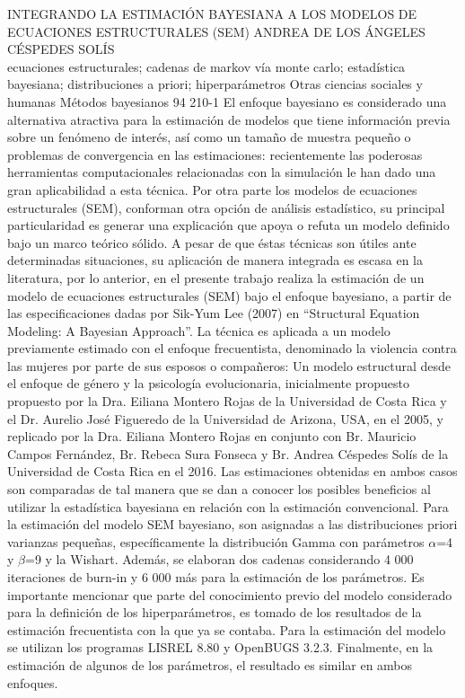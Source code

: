 \A
{INTEGRANDO LA ESTIMACIÓN BAYESIANA A LOS MODELOS DE ECUACIONES ESTRUCTURALES (SEM)}
{ANDREA DE LOS ÁNGELES CÉSPEDES SOLÍS}
{
\\
}
{ecuaciones estructurales; cadenas de markov vía monte carlo; estadística bayesiana; distribuciones a priori; hiperparámetros} 
 {Otras ciencias sociales y humanas} 
 {Métodos bayesianos} 
 {94} 
 {210-1}
{El enfoque bayesiano es considerado una alternativa atractiva para la estimación de modelos que tiene información previa sobre un fenómeno de interés, así como un tamaño de muestra pequeño o problemas de convergencia en las estimaciones: recientemente las poderosas herramientas computacionales relacionadas con la simulación le han dado una gran aplicabilidad a esta técnica. Por otra parte los modelos de ecuaciones estructurales (SEM), conforman otra opción de análisis estadístico, su principal particularidad es generar una explicación que apoya o refuta un modelo definido bajo un marco teórico sólido. A pesar de que éstas técnicas son útiles ante determinadas situaciones, su aplicación de manera integrada es escasa en la literatura, por lo anterior, en el presente trabajo realiza la estimación de un modelo de ecuaciones estructurales (SEM) bajo el enfoque bayesiano, a partir de las especificaciones dadas por Sik-Yum Lee (2007) en “Structural Equation Modeling: A Bayesian Approach”. La técnica es aplicada a un modelo previamente estimado con el enfoque frecuentista, denominado la violencia contra las mujeres por parte de sus esposos o compañeros: Un modelo estructural desde el enfoque de género y la psicología evolucionaria, inicialmente propuesto propuesto por la Dra. Eiliana Montero Rojas de la Universidad de Costa Rica y el Dr. Aurelio José Figueredo de la Universidad de Arizona, USA, en el 2005, y replicado por la Dra. Eiliana Montero Rojas en conjunto con Br. Mauricio Campos Fernández, Br. Rebeca Sura Fonseca y Br. Andrea Céspedes Solís de la Universidad de Costa Rica en el 2016. Las estimaciones obtenidas en ambos casos son comparadas de tal manera que se dan a conocer los posibles beneficios al utilizar la estadística bayesiana en relación con la estimación convencional. Para la estimación del modelo SEM bayesiano, son asignadas a las distribuciones priori varianzas pequeñas, específicamente la distribución Gamma con parámetros $\alpha$=4 y $\beta$=9 y la Wishart. Además, se elaboran dos cadenas considerando 4 000 iteraciones de burn-in y 6 000 más para la estimación de los parámetros. Es importante mencionar que parte del conocimiento previo del modelo considerado para la definición de los hiperparámetros, es tomado de los resultados de la estimación frecuentista con la que ya se contaba. Para la estimación del modelo se utilizan los programas LISREL 8.80 y OpenBUGS 3.2.3. Finalmente, en la estimación de algunos de los parámetros, el resultado es similar en ambos enfoques. }
